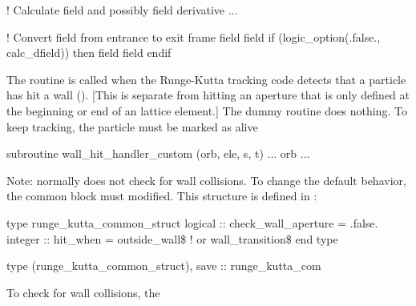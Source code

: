 {{{\begin{example}
  ! Calculate field and possibly field derivative
  ...

  ! Convert field from entrance to exit frame
  field%
  field%
  if (logic_option(.false., calc_dfield)) then
    field%
    field%
  endif
\end{example}


The  routine is called when the
Runge-Kutta tracking code  detects that a particle
has hit a wall (). [This is separate from hitting an
aperture that is only defined at the beginning or end of an lattice
element.] The dummy  routine does nothing.
To keep tracking, the particle must be marked as alive
\begin{example}
  subroutine wall_hit_handler_custom (orb, ele, s, t)
    ...
    orb%
    ...
\end{example}
Note:  normally does not check for wall collisions.
To change the default behavior, the  common block
must modified. This structure is defined in :
\begin{example}
  type runge_kutta_common_struct
    logical :: check_wall_aperture = .false.
    integer :: hit_when = outside_wall\$   ! or wall_transition\$
  end type

  type (runge_kutta_common_struct), save :: runge_kutta_com
\end{example}
To check for wall collisions, the \vn{%
must be set to true. The \vn{%
constitutes a collision. If this is set to \vn{outside_wall\$} (the
default), then any particle that is outside the wall is considered to
have hit the wall. If \vn{%
a collision occurs when the particle crosses the wall boundary. The
distinction between \vn{outside_wall\$} and \vn{wall_transition\$} is
important if particles are to be allowed to travel outside the wall.

\section{Custom Tracking: track1_preprocess and track1_postprocess)
\label{s:custom.track}
\index{track1_preprocess}\index{track1_postprocess}

}}}}}}}
